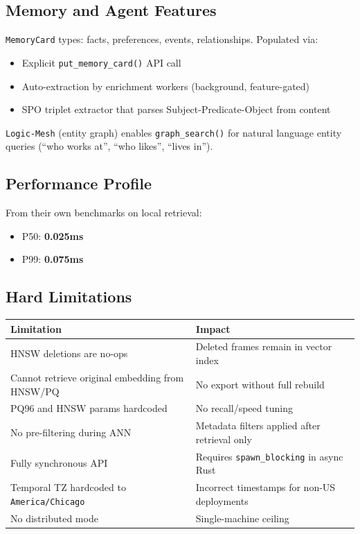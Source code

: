 \subsection{Memory and Agent Features}

\texttt{MemoryCard} types: facts, preferences, events, relationships. Populated via:

\begin{itemize}
    \item Explicit \texttt{put\_memory\_card()} API call
    \item Auto-extraction by enrichment workers (background, feature-gated)
    \item SPO triplet extractor that parses Subject-Predicate-Object from content
\end{itemize}

\texttt{Logic-Mesh} (entity graph) enables \texttt{graph\_search()} for natural language
entity queries (``who works at'', ``who likes'', ``lives in'').

\subsection{Performance Profile}

From their own benchmarks on local retrieval:

\begin{itemize}
    \item P50: \textbf{0.025ms}
    \item P99: \textbf{0.075ms}
\end{itemize}

\subsection{Hard Limitations}

\begin{center}
\begin{tabular}{ll}
\toprule
\textbf{Limitation} & \textbf{Impact} \\
\midrule
HNSW deletions are no-ops & Deleted frames remain in vector index \\
Cannot retrieve original embedding from HNSW/PQ & No export without full rebuild \\
PQ96 and HNSW params hardcoded & No recall/speed tuning \\
No pre-filtering during ANN & Metadata filters applied after retrieval only \\
Fully synchronous API & Requires \texttt{spawn\_blocking} in async Rust \\
Temporal TZ hardcoded to \texttt{America/Chicago} & Incorrect timestamps for non-US deployments \\
No distributed mode & Single-machine ceiling \\
\bottomrule
\end{tabular}
\end{center}

